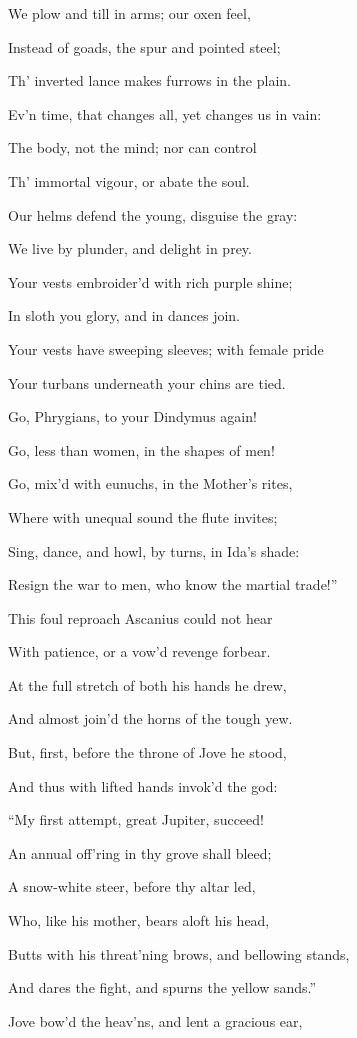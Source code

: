 We plow and till in arms; our oxen feel,

Instead of goads, the spur and pointed steel;

Th’ inverted lance makes furrows in the plain.

Ev’n time, that changes all, yet changes us in vain:

The body, not the mind; nor can control

Th’ immortal vigour, or abate the soul.

Our helms defend the young, disguise the gray:

We live by plunder, and delight in prey.

Your vests embroider’d with rich purple shine;

In sloth you glory, and in dances join.

Your vests have sweeping sleeves; with female pride

Your turbans underneath your chins are tied.

Go, Phrygians, to your Dindymus again!

Go, less than women, in the shapes of men!

Go, mix’d with eunuchs, in the Mother’s rites,

Where with unequal sound the flute invites;

Sing, dance, and howl, by turns, in Ida’s shade:

Resign the war to men, who know the martial trade!”

This foul reproach Ascanius could not hear

With patience, or a vow’d revenge forbear.

At the full stretch of both his hands he drew,

And almost join’d the horns of the tough yew.

But, first, before the throne of Jove he stood,

And thus with lifted hands invok’d the god:

“My first attempt, great Jupiter, succeed!

An annual off’ring in thy grove shall bleed;

A snow-white steer, before thy altar led,

Who, like his mother, bears aloft his head,

Butts with his threat’ning brows, and bellowing stands,

And dares the fight, and spurns the yellow sands.”

Jove bow’d the heav’ns, and lent a gracious ear,

